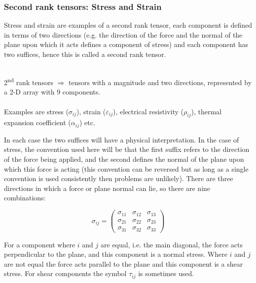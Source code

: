 \subsubsection{Second rank tensors: Stress and Strain}

Stress and strain are examples of a second rank tensor, each component is defined in terms of two directions (e.g. the direction of the force and the normal of the plane upon which it acts defines a component of stress) and each component has two suffices, hence this is called a second rank tensor.
\\
\\
\begin{annotation}
2\textsuperscript{nd} rank tensors $\Longrightarrow$ tensors with a magnitude and two directions, represented by a 2-D array with 9 components. 
\\
\\
Examples are stress ($\sigma_{ij}$), strain ($\varepsilon_{ij}$), electrical resistivity ($\rho_{ij}$), thermal expansion coefficient ($\alpha_{ij}$) etc.
\end{annotation}

In each case the two suffices will have a physical interpretation. In the case of stress, the convention used here will be that the first suffix refers to the direction of the force being applied, and the second defines the normal of the plane upon which this force is acting (this convention can be reversed but as long as a single convention is used consistently then problems are unlikely). There are three directions in which a force or plane normal can lie, so there are nine combinations:

\begin{equation}
\sigma_{ij} = 
\begin{pmatrix}
\sigma_{11} & \sigma_{12} & \sigma_{13} \\
\sigma_{21} & \sigma_{22} & \sigma_{23} \\
\sigma_{31} & \sigma_{32} & \sigma_{33}
\end{pmatrix}\label{eqn:general_stress_tensor}
\end{equation}

For a component where $i$ and $j$ are equal, i.e. the main diagonal, the force acts perpendicular to the plane, and this component is a normal stress. Where $i$ and $j$ are not equal the force acts parallel to the plane and this component is a shear stress. For shear components the symbol $\tau_{ij}$ is sometimes used.
\\
\\


